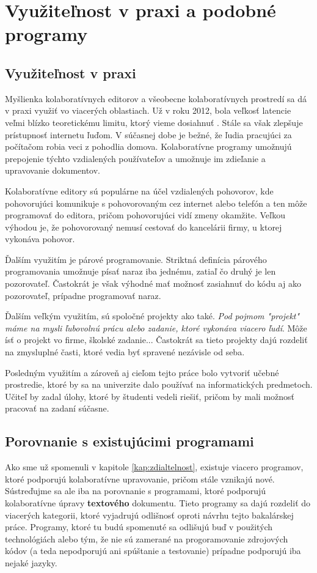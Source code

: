 \chapter{Využiteľnost v praxi a podobné programy}

\label{kap:usability_and_similar} %

\section{Využiteľnost v praxi}
Myšlienka kolaboratívnych editorov a všeobecne kolaboratívnych prostredí sa dá v praxi využiť vo 
viacerých oblastiach. Už v roku 2012, bola veľkosť latencie veľmi blízko teoretickému limitu,
ktorý vieme dosiahnuť \cite{latency_bottleneck}. Stále sa však zlepšuje prístupnosť internetu
ľuďom. V súčasnej dobe je bežné, že ľudia pracujúci za počítačom robia veci z pohodlia domova.
Kolaboratívne programy umožnujú prepojenie týchto vzdialených používateľov a umožnuje im zdieľanie
a upravovanie dokumentov.

Kolaboratívne editory sú populárne na účel vzdialených pohovorov, kde pohovorujúci komunikuje s
pohovorovaným cez internet alebo telefón a ten môže programovať do editora, pričom pohovorujúci 
vidí zmeny okamžite. Veľkou výhodou je, že pohovorovaný nemusí cestovať do kancelárii firmy, u
ktorej vykonáva pohovor.

Ďalším využitím je párové programovanie. Striktná definícia párového programovania umožnuje
písať naraz iba jednému, zatiaľ čo druhý je len pozorovateľ. Častokrát je však výhodné mať možnosť
zasiahnuť do kódu aj ako pozorovateľ, prípadne programovať naraz.

Ďalším veľkým využitím, sú spoločné projekty ako také. \textit{Pod pojmom "projekt" máme na mysli
ľubovolnú prácu alebo zadanie, ktoré vykonáva viacero ľudí}. Môže ísť o projekt vo firme, školské
zadanie... Častokrát sa tieto projekty dajú rozdeliť na zmysluplné časti, ktoré vedia byť spravené 
nezávisle od seba.

Posledným využitím a zároveň aj cieľom tejto práce bolo vytvoriť učebné prostredie, ktoré by sa na
univerzite dalo používať na informatických predmetoch. Učiteľ by zadal úlohy, ktoré by študenti
vedeli riešiť, pričom by mali možnosť pracovať na zadaní súčasne.

\section{Porovnanie s existujúcimi programami}
Ako sme už spomenuli v kapitole \ref{kap:zdialtelnost}, existuje viacero programov, ktoré podporujú
kolaboratívne upravovanie, pričom stále vznikajú nové. Sústreďujme sa ale iba na porovnanie s
programami, ktoré podporujú kolaboratívne úpravy \textbf{textového} dokumentu. Tieto programy sa
dajú rozdeliť do viacerých kategorii, ktoré vyjadrujú odlišnosť oproti návrhu tejto bakalárskej
práce. Programy, ktoré tu budú spomenuté sa odlišujú buď v použitých technológiách alebo tým, že nie
sú zamerané na progoramovanie zdrojových kódov (a teda nepodporujú ani spúštanie a testovanie)
prípadne podporujú iba nejaké jazyky.

